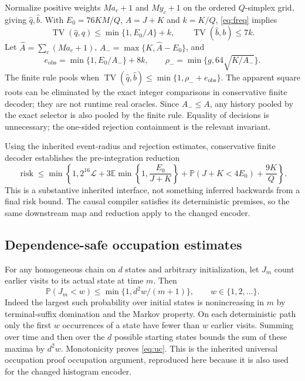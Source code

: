 \documentclass[11pt,letterpaper]{article}
\theoremstyle{definition}\newtheorem{definition}[theorem]{Definition}
\theoremstyle{remark}\newtheorem{remark}[theorem]{Remark}
\newcommand{\TV}{\operatorname{TV}}
\newcommand{\E}{\mathbb{E}}
\newcommand{\Prob}{\mathbb{P}}
\begin{document}
Normalize positive weights $Ma_c+1$ and $My_c+1$ on the ordered $Q$-simplex grid, giving $\widehat q,\widehat b$. With $E_0=76KM/Q$, $A=J+K$ and $k=K/Q$, \eqref{eq:freq} implies
\[
 \TV(\widehat q,q)\le\min\{1,E_0/A\}+k,\qquad
 \TV(\widehat b,b)\le7k.
\]
Let $\widehat A=\sum_c(Ma_c+1)$, $A_-=\max\{K,\widehat A-E_0\}$, and
\[
 e_{\mathrm{obs}}=\min\{1,E_0/A_-\}+8k,\qquad
 \rho_-=\min\{g,64\sqrt{K/A_-}\}.
\]
The finite rule pools when $\TV(\widehat q,\widehat b)\le\min\{1,\rho_-+e_{\mathrm{obs}}\}$. The apparent square roots can be eliminated by the exact integer comparisons in conservative finite decoder; they are not runtime real oracles. Since $A_-\le A$, any history pooled by the exact selector is also pooled by the finite rule. Equality of decisions is unnecessary; the one-sided rejection containment is the relevant invariant.

Using the inherited event-radius and rejection estimates, conservative finite decoder establishes the pre-integration reduction
\begin{equation}\label{eq:preint}
 \operatorname{risk}\le\min\left\{1,2^{16}\mathcal L+
 3\E\min\left\{1,\frac{E_0}{J+K}\right\}
 +\Prob(J+K<4E_0)+\frac{9K}{Q}\right\}.
\end{equation}
This is a substantive inherited interface, not something inferred backwards from a final risk bound. The causal compiler satisfies its deterministic premises, so the same downstream map and reduction apply to the changed encoder.

\subsection{Dependence-safe occupation estimates}
For any homogeneous chain on $d$ states and arbitrary initialization, let $J_m$ count earlier visits to its actual state at time $m$. Then
\begin{equation}\label{eq:uc}
 \Prob(J_m<w)\le\min\{1,d^2w/(m+1)\},\qquad w\in\{1,2,\ldots\}.
\end{equation}
Indeed the largest such probability over initial states is nonincreasing in $m$ by terminal-suffix domination and the Markov property. On each deterministic path only the first $w$ occurrences of a state have fewer than $w$ earlier visits. Summing over time and then over the $d$ possible starting states bounds the sum of these maxima by $d^2w$. Monotonicity proves \eqref{eq:uc}. This is the inherited universal occupation proof occupation argument, reproduced here because it is also used for the changed histogram encoder.
\end{document}
